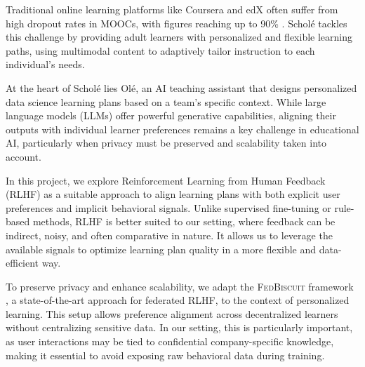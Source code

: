 



Traditional online learning platforms like Coursera and edX often suffer from high dropout rates in MOOCs, with figures reaching up to 90\% \cite{warwick65543}. Scholé tackles this challenge by providing adult learners with personalized and flexible learning paths, using multimodal content to adaptively tailor instruction to each individual's needs.

At the heart of Scholé lies Olé, an AI teaching assistant that designs personalized data science learning plans based on a team’s specific context. While large language models (LLMs) offer powerful generative capabilities, aligning their outputs with individual learner preferences remains a key challenge in educational AI, particularly when privacy must be preserved and scalability taken into account.

In this project, we explore Reinforcement Learning from Human Feedback (RLHF) \cite{ouyang2022traininglanguagemodelsfollow} as a suitable approach to align learning plans with both explicit user preferences and implicit behavioral signals. Unlike supervised fine-tuning or rule-based methods, RLHF is better suited to our setting, where feedback can be indirect, noisy, and often comparative in nature. It allows us to leverage the available signals to optimize learning plan quality in a more flexible and data-efficient way.

To preserve privacy and enhance scalability, we adapt the \textsc{FedBiscuit} framework \cite{wu2025federatedrlhfaggregatedclient}, a state-of-the-art approach for federated RLHF, to the context of personalized learning. This setup allows preference alignment across decentralized learners without centralizing sensitive data. In our setting, this is particularly important, as user interactions may be tied to confidential company-specific knowledge, making it essential to avoid exposing raw behavioral data during training.

